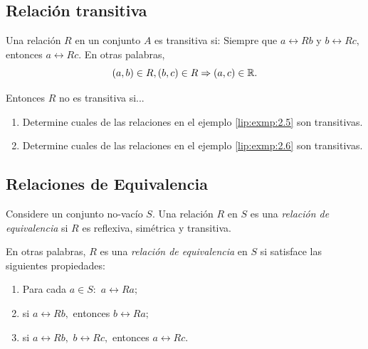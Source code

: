 \subsection{Relaci\'on transitiva}


	Una relaci\'on $R$ en un conjunto $A$ es transitiva si: Siempre que $a\rel{R}b$ y $b\rel{R}c,$ entonces $a\rel{R}c.$  En otras palabras, 
	$$
	(a,b)\in R, (b,c)\in R \Rightarrow (a,c)\in \mathbb{R}.
	$$
	
	
	Entonces $R$ no es transitiva si...



	\begin{exmp}
		\label{lip:exmp:2.9}
		\begin{enumerate}
			\item   Determine cuales de las relaciones en el ejemplo \ref{lip:exmp:2.5} son transitivas.
			\item Determine cuales de las relaciones en el ejemplo \ref{lip:exmp:2.6} son transitivas.
		\end{enumerate}
		
	\end{exmp}


% 
% 
% 
% 
% 

\subsection{Relaciones de Equivalencia}

	Considere un conjunto no-vac\'io $S.$ Una relaci\'on $R$ en $S$ es una \emph{relaci\'on de equivalencia} si $R$ es reflexiva, sim\'etrica y transitiva.



	En otras palabras, $R$ es una \emph{relaci\'on de equivalencia} en $S$ si satisface las siguientes propiedades:
	\begin{enumerate}
		\item Para cada $a\in S:$ $a\rel{R}a;$
		\item si $a\rel{R}b,$ entonces $b\rel{R}a;$
		\item si $a\rel{R}b,$ $b\rel{R}c,$ entonces $a\rel{R}c.$
	\end{enumerate}
	



